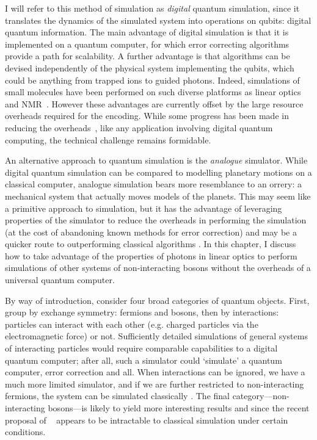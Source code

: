 I will refer to this method of simulation as \emph{digital} quantum simulation,
since it translates the dynamics of the simulated system into operations on
qubits: digital quantum information. The main advantage of digital simulation is
that it is implemented on a quantum computer, for which error correcting
algorithms provide a path for scalability. A further advantage is that
algorithms can be devised independently of the physical system implementing the
qubits, which could be anything from trapped ions to guided photons. Indeed,
simulations of small molecules have been performed on such diverse platforms as
linear optics~\cite{qsim-peruzzo} and NMR~\cite{qsim-du}.
However these advantages are currently offset by the large resource overheads
required for the encoding. While some progress has been made in reducing the
overheads~\cite{qsim-poulin}, like any application involving digital quantum
computing, the technical challenge remains formidable.

An alternative approach to quantum simulation is the \emph{analogue} simulator.
While digital quantum simulation can be compared to modelling planetary motions
on a classical computer, analogue simulation bears more resemblance to an
orrery: a mechanical system that actually moves models of the planets. This may
seem like a primitive approach to simulation, but it has the advantage of
leveraging properties of the simulator to reduce the overheads in performing the
simulation (at the cost of abandoning known methods for error correction) and
may be a quicker route to outperforming classical algorithms
\cite{qsim-analogue}. In
this chapter, I discuss how to take advantage of the properties of photons in
linear optics to perform simulations of other systems of non-interacting bosons
without the overheads of a universal quantum computer.

By way of introduction, consider four broad categories of quantum objects.
First, group by exchange symmetry: fermions and bosons, then by interactions:
particles can interact with each other (e.g. charged particles via the
electromagnetic force) or not. Sufficiently detailed simulations of general
systems of interacting particles would require comparable capabilities to a
digital quantum computer; after all, such a simulator could `simulate' a quantum
computer, error correction and all. When interactions can be ignored, we have a
much more limited simulator, and if we are further restricted to non-interacting
fermions, the system can be simulated classically \cite{qsim-fermions}. The
final category---non-interacting bosons---is likely to yield more interesting
results and since the recent proposal of \bosonsampling{}~\cite{bosonsampling}
appears to be intractable to classical simulation under certain conditions.

